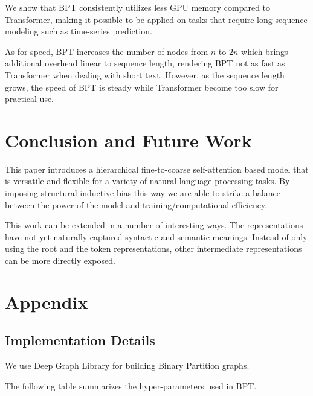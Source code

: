 \documentclass[11pt,a4paper]{article}
\begin{document}
We show that BPT consistently utilizes less GPU memory compared to Transformer, making it possible to be applied on tasks that require long sequence modeling such as time-series prediction.

As for speed, BPT increases the number of nodes from $n$ to $2n$ which brings additional overhead linear to sequence length, rendering BPT not as fast as Transformer when dealing with short text. However, as the sequence length grows, the speed of BPT is steady while Transformer become too slow for practical use.

\section{Conclusion and Future Work}

This paper introduces a hierarchical fine-to-coarse self-attention based model that is versatile and flexible for a variety of natural language processing tasks.
By imposing structural inductive bias this way we are able to strike a balance between the power of the model and training/computational efficiency.




This work can be extended in a number of interesting ways. The representations have not yet naturally captured syntactic and semantic meanings. Instead of only using the root and the token representations, other intermediate representations can be more directly exposed.





\appendix
\section{Appendix}
\label{sec:appendix}

\subsection{Implementation Details}
\label{app:hyper}
We use Deep Graph Library \cite{wang2019dgl} for building Binary Partition graphs.

The following table summarizes the hyper-parameters used in BPT.
\end{document}
